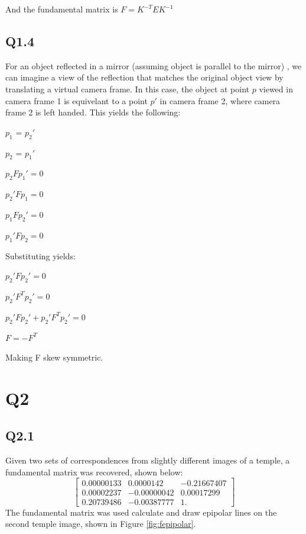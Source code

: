 \documentclass[12pt]{article}
\begin{document}
And the fundamental matrix is $F = K^{-T} E K^{-1}$ 

\newpage
\subsection{Q1.4}
For an object reflected in a mirror (assuming object is parallel to the mirror) , we can imagine a view of the reflection that matches the original object view by translating a virtual camera frame.  
In this case, the object at point $p$ viewed in camera frame 1 is equivelant to a point $p'$ in camera frame 2, where camera frame 2 is left handed.
This yields the following:
  
$p_{1}$ = $p_{2}'$  
  
$p_{2}$ = $p_{1}'$  
  
$p_{2}  F p_{1}' = 0$  
  
$p_{2}' F p_{1}  = 0$  
  
$p_{1}  F p_{2}' = 0$  
  
$p_{1}' F p_{2}  = 0$  

Substituting yields: 
  
$p_{2}' F     p_{2}' = 0$
  
$p_{2}' F^{T} p_{2}' = 0$
  
$p_{2}' F     p_{2}' + p_{2}' F^{T} p_{2}' = 0$
  
$F = -F^{T}$
  
Making F skew symmetric.
  
\newpage
\section{Q2}
\subsection{Q2.1}
Given two sets of correspondences from slightly different images of a temple, a fundamental matrix was recovered, shown below:
$$
\begin{bmatrix}
0.00000133  &  0.0000142  &  -0.21667407 \\
0.00002237  & -0.00000042 &  0.00017299 \\
0.20739486  & -0.00387777 &   1.         
\end{bmatrix}
$$
The fundamental matrix was used calculate and draw epipolar lines on the second temple image, shown in Figure \ref{fig:fepipolar}.
\end{document}
